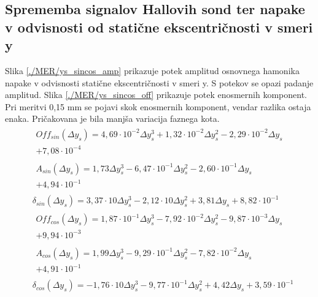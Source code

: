 \subsection{Sprememba signalov Hallovih sond ter napake v odvisnosti od statične ekscentričnosti v smeri y}
Slika \ref{./MER/ys_sincos_amp} prikazuje potek amplitud osnovnega hamonika napake v odvisnosti statične ekscentričnosti v smeri y. S potekov se opazi padanje amplitud.
Slika \ref{./MER/ys_sincos_off} prikazuje potek enosmernih komponent. Pri meritvi 0,15 mm se pojavi skok enosmernih komponent, vendar razlika ostaja enaka.
Pričakovana je bila manjša variacija faznega kota.
\begin{eqnarray}
&\begin{split}Off_{sin}(\Delta y_s) =4,69\cdot 10^{-2}\Delta y_s^{3}+1,32\cdot 10^{-2}\Delta y_s^{2}-2,29\cdot 10^{-2}\Delta y_s\\+7,08\cdot 10^{-4}\end{split} \\
&\begin{split}A_{sin}(\Delta y_s) =1,73\Delta y_s^{3}-6,47\cdot 10^{-1}\Delta y_s^{2}-2,60\cdot 10^{-1}\Delta y_s\\+4,94\cdot 10^{-1} \end{split}\\               
&\delta_{sin} (\Delta y_s) =3,37\cdot 10\Delta y_s^{3}-2,12\cdot 10\Delta y_s^{2}+3,81\Delta y_s+8,82\cdot 10^{-1} \\                           
&\begin{split}Off_{cos}(\Delta y_s) =1,87\cdot 10^{-1}\Delta y_s^{3}-7,92\cdot 10^{-2}\Delta y_s^{2}-9,87\cdot 10^{-3}\Delta y_s\\+9,94\cdot 10^{-3} \end{split}\\
&\begin{split}A_{cos}(\Delta y_s) =1,99\Delta y_s^{3}-9,29\cdot 10^{-1}\Delta y_s^{2}-7,82\cdot 10^{-2}\Delta y_s\\+4,91\cdot 10^{-1} \end{split}\\               
&\delta_{cos}(\Delta y_s) =-1,76\cdot 10\Delta y_s^{3}-9,77\cdot 10^{-1}\Delta y_s^{2}+4,42\Delta y_s+3,59\cdot 10^{-1}
\end{eqnarray}


